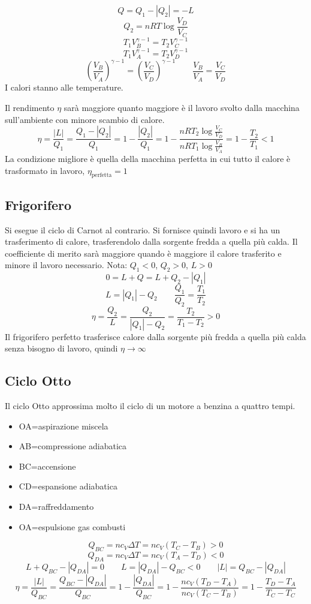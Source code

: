 $$Q=Q_1-|Q_2|=-L$$
$$Q_2=nRT\log\frac{V_D}{V_C}$$
$$T_1V_B^{\gamma-1}=T_2V_C^{\gamma-1}$$
$$T_1V_A^{\gamma-1}=T_2V_D^{\gamma-1}$$
$$\left(\frac{V_B}{V_A}\right)^{\gamma-1}=\left(\frac{V_C}{V_D}\right)^{\gamma-1}\qquad \frac{V_B}{V_A}=\frac{V_C}{V_D}$$
I calori stanno alle temperature.

Il rendimento $\eta$ sarà maggiore quanto maggiore è il lavoro svolto dalla macchina sull'ambiente con minore scambio di calore.
$$\eta=\frac{|L|}{Q_1}=\frac{Q_1-|Q_2|}{Q_1}=1-\frac{|Q_2|}{Q_1}=1-\frac{nRT_2\log\frac{V_C}{V_D}}{nRT_1\log\frac{V_B}{V_A}}=1-\frac{T_2}{T_1}<1$$
La condizione migliore è quella della macchina perfetta in cui tutto il calore è trasformato in lavoro, $\eta_\text{perfetta}= 1$

\subsection{Frigorifero}
Si esegue il ciclo di Carnot al contrario. Si fornisce quindi lavoro e si ha un trasferimento di calore, trasferendolo dalla sorgente fredda a quella più calda.
Il coefficiente di merito sarà maggiore quando è maggiore il calore trasferito e minore il lavoro necessario.
Nota: $Q_1<0$, $Q_2>0$, $L>0$
$$0=L+Q=L+Q_2-|Q_1|$$
$$L=|Q_1|-Q_2\qquad\frac{Q_1}{Q_2}=\frac{T_1}{T_2}$$
$$\eta=\frac{Q_2}{L}=\frac{Q_2}{|Q_1|-Q_2}=\frac{T_2}{T_1-T_2}>0$$
Il frigorifero perfetto trasferisce calore dalla sorgente più fredda a quella più calda senza bisogno di lavoro, quindi $\eta\rightarrow\infty$

\subsection{Ciclo Otto}
Il ciclo Otto approssima molto il ciclo di un motore a benzina a quattro tempi.
\begin{itemize}
\item[] OA=aspirazione miscela
\item[] AB=compressione adiabatica
\item[] BC=accensione
\item[] CD=espansione adiabatica
\item[] DA=raffreddamento
\item[] OA=espulsione gas combusti
\end{itemize}

$$Q_{BC}=nc_V\Delta T=nc_V(T_C-T_B)>0$$
$$Q_{DA}=nc_V\Delta T=nc_V(T_A-T_D)<0$$
$$L+Q_{BC}-|Q_{DA}|=0 \qquad L=|Q_{DA}|-Q_{BC}<0\qquad |L|=Q_{BC}-|Q_{DA}|$$
$$\eta=\frac{|L|}{Q_{BC}}=\frac{Q_{BC}-|Q_{DA}|}{Q_{BC}}=1-\frac{|Q_{DA}|}{Q_{BC}}=1-\frac{nc_V(T_D-T_A)}{nc_V(T_C-T_B)}=1-\frac{T_D-T_A}{T_C-T_C}$$

